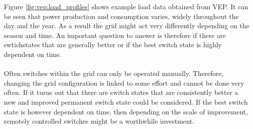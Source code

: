 Figure \ref{fig:vep:load_profiles} shows example load data obtained from VEP. It can be seen
that power production and consumption varies, widely throughout the day and the year. As a result the grid
might act very differently depending on the season and time. An important question to answer is therefore if
there are swtichstates that are generally better or if the best switch state is highly dependent on
time.\\
\\
Often switches within the grid can only be operated manually\autocite{venios}. Therefore, changing the grid configuration is linked to
some effort and cannot be done very often. If it turns out that there are switch states that are consistently better
a new and improved permanent switch state could be considered. If the best switch state is
however dependent on time, then depending on the scale of improvement, remotely controlled switches might be a worthwhile
investment.